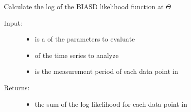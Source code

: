\documentclass[letterpaper,10pt,english]{sphinxmanual}
\begin{document}
\begin{fulllineitems}
\label{code_likelihood:likelihood.log_likelihood}
Calculate the log of the BIASD likelihood function at \(\Theta\)
\begin{description}
\item[{Input:}] \leavevmode\begin{itemize}
\item {} 
 is a  of the parameters to evaluate

\item {} 
 of the time series to analyze

\item {} 
 is the measurement period of each data point in 

\end{itemize}

\item[{Returns:}] \leavevmode\begin{itemize}
\item {} 
the sum of the log-likelihood for each data point in 

\end{itemize}

\end{description}

\end{fulllineitems}

\end{document}
